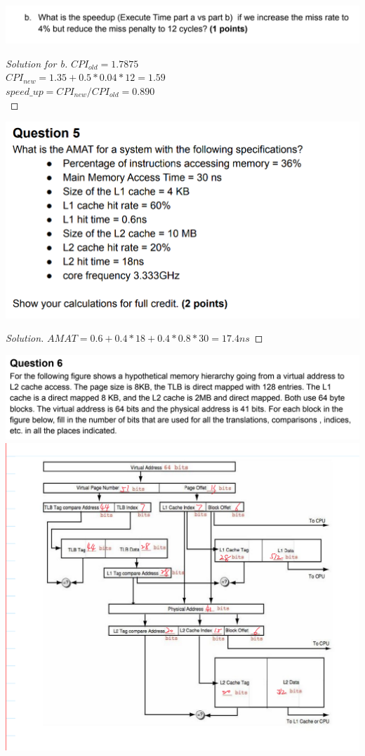 \documentclass[12pt]{article}
\begin{document}
\includegraphics[scale=0.37]{q4_b.png}\\
\begin{proof}[Solution for b]
	$CPI_{old} = 1.7875$\\
	$CPI_{new} = 1.35 + 0.5 * 0.04 * 12 = 1.59$\\
	$speed\_up = CPI_{new} / CPI_{old} = 0.890$\\
\end{proof}
\includegraphics[scale=0.37]{q5_q.png}\\
\begin{proof}[Solution]
	$AMAT=0.6+0.4*18+0.4*0.8*30=17.4ns$
\end{proof}
\includegraphics[scale=0.37]{q6_q.png}\\
\includegraphics[scale=0.34]{q6.png}\\
\end{document}
